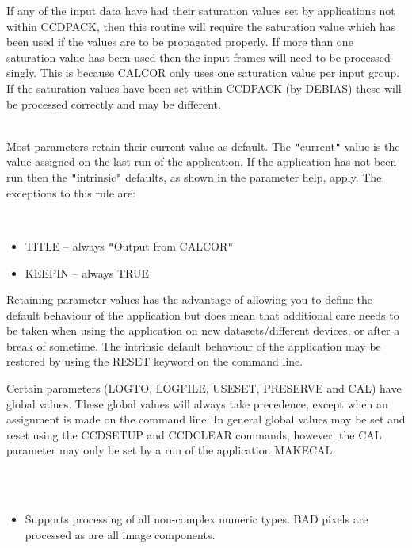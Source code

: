 \documentclass[twoside,11pt]{article}
\newcommand{\htmlref}[2]{#1}
\renewcommand{\_}{\texttt{\symbol{95}}}
\newcommand{\qt}[1]{{\tt "}#1{\tt "}}
\newcommand{\routine}[1]{{\sc #1}}
\newcommand{\xroutine}[1]{\htmlref{{\sc #1}}{#1}}
\newcommand{\sstdiytopic}[2]{\item[#1:] \mbox{} \\[1.3ex] #2}
\newcommand{\sstimplementationstatus}[1]{
   \item[{Implementation Status:}] \mbox{} \\[1.3ex] #1}
\newcommand{\sstitemlist}[1]{
  \mbox{} \\
  \vspace{-3.5ex}
  \begin{itemize}
     #1
  \end{itemize}
}
\newcommand{\sstitem}{\item}
\newcommand{\sstdiytopic}[2]{\item[{#1}] #2 }
\newcommand{\sstimplementationstatus}[1]{
      \item[Implementation Status:] #1
   }
\newcommand{\sstitemlist}[1]{
      \begin{itemize}
         #1
      \end{itemize}
      \\
   }
\newcommand{\sstitem}{\item}
\begin{document}
{{{         \sstitem
         If any of the input data have had their saturation values set
           by applications not within CCDPACK, then this routine will
           require the saturation value which has been used if the values
           are to be propagated properly. If more than one saturation
           value has been used then the input frames will need to be
           processed singly. This is because \routine{CALCOR} only uses one
           saturation value per input group. If the saturation values
           have been set within CCDPACK (by \xroutine{DEBIAS}) these will be
           processed correctly and may be different.
      }
   }
   \sstdiytopic{
      Behaviour of parameters
   } {
      Most parameters retain their current value as default. The
      \qt{current} value is the value assigned on the last run of the
      application. If the application has not been run then the
      \qt{intrinsic} defaults, as shown in the parameter help, apply.
      The exceptions to this rule are:
      \sstitemlist{

         \sstitem
            TITLE   -- always \qt{Output from CALCOR}

         \sstitem
            KEEPIN  -- always TRUE

      }
      Retaining parameter values has the advantage of allowing you to
      define the default behaviour of the application but does mean
      that additional care needs to be taken when using the application
      on new datasets/different devices, or after a break of sometime.
      The intrinsic default behaviour of the application may be
      restored by using the RESET keyword on the command line.

      Certain parameters (LOGTO, LOGFILE, USESET, PRESERVE and CAL) have
      global values. These global values will always take precedence,
      except when an assignment is made on the command line.  In general
      global values may be set and reset using the \xroutine{CCDSETUP} and
      \xroutine{CCDCLEAR} commands, however, the CAL parameter may only be set by
      a run of the application \xroutine{MAKECAL}.
   }
   \sstimplementationstatus{
      \sstitemlist{

         \sstitem
         Supports processing of all non-complex numeric types.
           BAD pixels are processed as are all image components.
      }
   }
}
\end{document}
